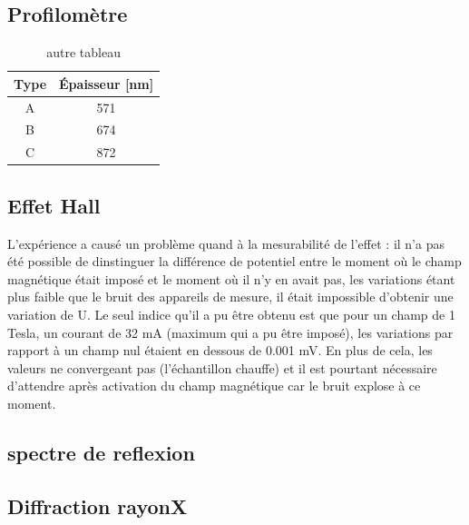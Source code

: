 \documentclass[a4paper,12pt,oneside]{article}
\begin{document}
\subsection{Profilomètre}

\begin{table}
\centering
   \begin{tabular}{|c|c|}
	  \hline
      Type & Épaisseur [nm]\\
      \hline
      A & 571 \\
      B & 674 \\
      C & 872 \\
      \hline
   \end{tabular}
   \caption{autre tableau}\label{tab:profil}
\end{table}


\subsection{Effet Hall}

L'expérience a causé un problème quand à la mesurabilité de l'effet : il n'a pas été possible de dinstinguer la différence de potentiel entre le moment où le champ magnétique était imposé et le moment où il n'y en avait pas, les variations étant plus faible que le bruit des appareils de mesure, il était impossible d'obtenir une variation de U. Le seul indice qu'il a pu être obtenu est que pour un champ de 1 Tesla, un courant de 32 mA (maximum qui a pu être imposé), les variations par rapport à un champ nul étaient en dessous de 0.001 mV. En plus de cela, les valeurs ne convergeant pas (l'échantillon chauffe) et il est pourtant nécessaire d'attendre après activation du champ magnétique car le bruit explose à ce moment.


\subsection{spectre de reflexion}



\subsection{Diffraction rayonX}
\end{document}
